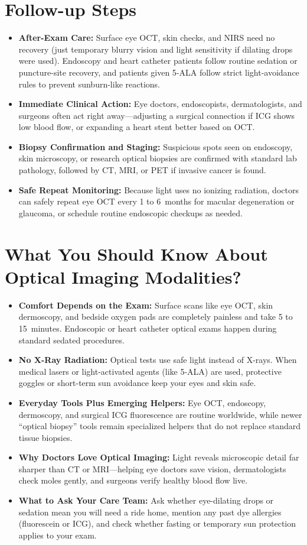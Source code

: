 \section{Follow-up Steps}
\begin{itemize}
  \item \textbf{After-Exam Care:} Surface eye OCT, skin checks, and NIRS need no recovery (just temporary blurry vision and light sensitivity if dilating drops were used). Endoscopy and heart catheter patients follow routine sedation or puncture-site recovery, and patients given 5-ALA follow strict light-avoidance rules to prevent sunburn-like reactions.
  \item \textbf{Immediate Clinical Action:} Eye doctors, endoscopists, dermatologists, and surgeons often act right away---adjusting a surgical connection if ICG shows low blood flow, or expanding a heart stent better based on OCT.
  \item \textbf{Biopsy Confirmation and Staging:} Suspicious spots seen on endoscopy, skin microscopy, or research optical biopsies are confirmed with standard lab pathology, followed by CT, MRI, or PET if invasive cancer is found.
  \item \textbf{Safe Repeat Monitoring:} Because light uses no ionizing radiation, doctors can safely repeat eye OCT every 1 to 6~months for macular degeneration or glaucoma, or schedule routine endoscopic checkups as needed.
\end{itemize}

\section{What You Should Know About Optical Imaging Modalities?}
\begin{itemize}
  \item \textbf{Comfort Depends on the Exam:} Surface scans like eye OCT, skin dermoscopy, and bedside oxygen pads are completely painless and take 5 to 15~minutes. Endoscopic or heart catheter optical exams happen during standard sedated procedures.
  \item \textbf{No X-Ray Radiation:} Optical tests use safe light instead of X-rays. When medical lasers or light-activated agents (like 5-ALA) are used, protective goggles or short-term sun avoidance keep your eyes and skin safe.
  \item \textbf{Everyday Tools Plus Emerging Helpers:} Eye OCT, endoscopy, dermoscopy, and surgical ICG fluorescence are routine worldwide, while newer ``optical biopsy'' tools remain specialized helpers that do not replace standard tissue biopsies.
  \item \textbf{Why Doctors Love Optical Imaging:} Light reveals microscopic detail far sharper than CT or MRI---helping eye doctors save vision, dermatologists check moles gently, and surgeons verify healthy blood flow live.
  \item \textbf{What to Ask Your Care Team:} Ask whether eye-dilating drops or sedation mean you will need a ride home, mention any past dye allergies (fluorescein or ICG), and check whether fasting or temporary sun protection applies to your exam.
\end{itemize}

